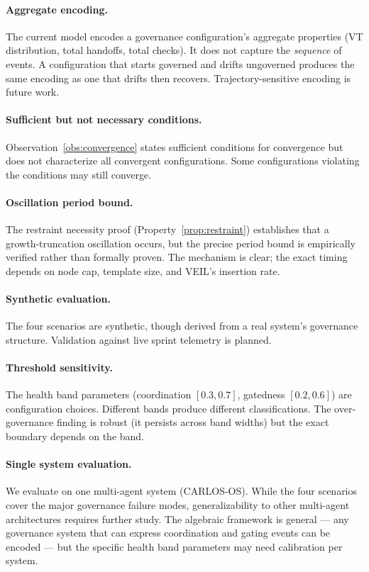 \documentclass[sigconf,nonacm]{acmart}
\begin{document}
\paragraph{Aggregate encoding.}
The current model encodes a governance configuration's aggregate properties
(VT distribution, total handoffs, total checks). It does not capture the
\emph{sequence} of events. A configuration that starts governed and drifts
ungoverned produces the same encoding as one that drifts then recovers.
Trajectory-sensitive encoding is future work.

\paragraph{Sufficient but not necessary conditions.}
Observation~\ref{obs:convergence} states sufficient conditions for
convergence but does not characterize all convergent configurations. Some
configurations violating the conditions may still converge.

\paragraph{Oscillation period bound.}
The restraint necessity proof (Property~\ref{prop:restraint}) establishes
that a growth-truncation oscillation occurs, but the precise period bound
is empirically verified rather than formally proven. The mechanism is
clear; the exact timing depends on node cap, template size, and VEIL's
insertion rate.

\paragraph{Synthetic evaluation.}
The four scenarios are synthetic, though derived from a real system's
governance structure. Validation against live sprint telemetry is planned.

\paragraph{Threshold sensitivity.}
The health band parameters (coordination $[0.3, 0.7]$, gatedness
$[0.2, 0.6]$) are configuration choices. Different bands produce different
classifications. The over-governance finding is robust (it persists across
band widths) but the exact boundary depends on the band.

\paragraph{Single system evaluation.}
We evaluate on one multi-agent system (CARLOS-OS). While the four scenarios
cover the major governance failure modes, generalizability to other
multi-agent architectures requires further study. The algebraic framework
is general --- any governance system that can express coordination and
gating events can be encoded --- but the specific health band parameters
may need calibration per system.
\end{document}
